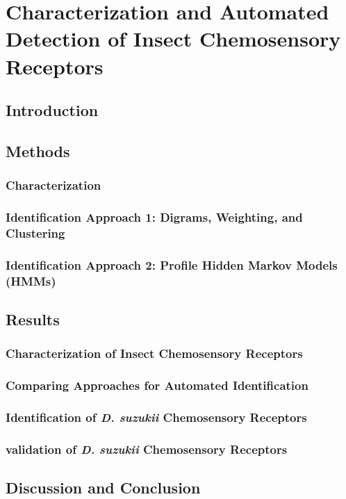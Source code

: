 \section{Characterization and Automated Detection of Insect Chemosensory Receptors}

\subsection{Introduction}

\subsection{Methods}

\subsubsection{Characterization}

\subsubsection{Identification Approach 1: Digrams, Weighting, and Clustering}

\subsubsection{Identification Approach 2: Profile Hidden Markov Models (HMMs)}

\subsection{Results}

\subsubsection{Characterization of Insect Chemosensory Receptors}

\subsubsection{Comparing Approaches for Automated Identification}

\subsubsection{Identification of \emph{D. suzukii} Chemosensory Receptors}

\subsubsection{validation of \emph{D. suzukii} Chemosensory Receptors}

\subsection{Discussion and Conclusion}